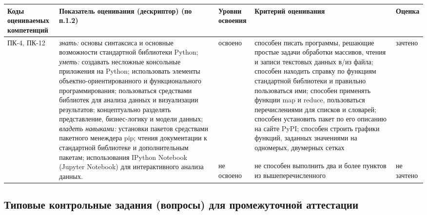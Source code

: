 \documentclass[a4paper,12pt]{article}
\begin{document}
\begin{longtable}{|p{15mm}|p{53mm}|p{16mm}|p{43mm}|p{14mm}|}
\hline
  \centering\small Коды оцениваемых компетенций
& \centering Показатель оценивания (дескриптор) (по п.1.2) 
& \centering\small Уровни освоения 
& \centering Критерий оценивания 
& \centering\small\arraybackslash Оценка
\\
\hline
\multirow{2}{15mm}{ПК-4, ПК-12}
&
\multirow{2}{53mm}{\parbox{53mm}{%
\vrule width 0pt height 10pt \emph{знать:}\newline
основы синтаксиса и основные возможности стандартной библиотеки Python; \newline
\emph{уметь:}\newline
создавать несложные консольные приложения на Python; использовать элементы объект\-но-ориен\-ти\-ро\-ван\-но\-го и функционального программирования; пользоваться средствами библиотек для анализа данных и визуализации результатов; концептуально разделять представление, бизнес-логику и модели данных; \newline
\emph{владеть навыками:}\newline
установки пакетов средствами пакетного менеждера pip; чтения документации к стандартной библиотеке и дополнительным пакетам; использования IPython Notebook (Jupyter Notebook) для интерактивного анализа данных. 
}}
& 
освоено & способен писать программы, решающие простые задачи обработки массивов,
чтения и записи текстовых данных в/из файла; способен находить справку
по функциям стандартной библиотеки и правильно пользоваться ими;
способен применять функции map и reduce, пользоваться перечислениями
для списков и словарей; способен установить пакет по его описанию на сайте PyPI;
способен строить графики функций, заданных   значениями на одномерых, двумерных сетках & зачтено 
\\ 
\cline{3-5}

& & не освоено & не способен выполнить два и более пунктов из вышеперечисленного\linebreak~\linebreak & не зачтено 
\\


\hline
\end{longtable}



\newpage\subsection{Типовые контрольные задания (вопросы) для промежуточной аттестации}
\end{document}
